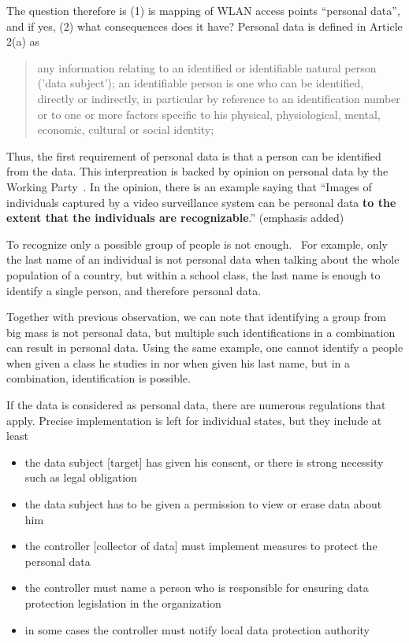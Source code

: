 \documentclass[12pt,a4paper,oneside,pdftex]{report}
\begin{document}
The question therefore is (1) is mapping of WLAN access points ``personal data'', and if yes, (2) what consequences does it have? Personal data is defined in Article 2(a) as

\begin{quote}
    any information relating to an identified or identifiable natural person ('data subject'); an identifiable person is one who can be identified, directly or indirectly, in particular by reference to an identification number or to one or more factors specific to his physical, physiological, mental, economic, cultural or social identity;
\end{quote}

Thus, the first requirement of personal data is that a person can be identified from the data. This interpreation is backed by opinion on personal data by the Working Party~\cite{wp29_136}. In the opinion, there is an example saying that ``Images of individuals captured by a video surveillance system can be personal data \textbf{to the extent that the individuals are recognizable}.'' (emphasis added)

To recognize only a possible group of people is not enough.~\cite{wp29_136} For example, only the last name of an individual is not personal data when talking about the whole population of a country, but within a school class, the last name is enough to identify a single person, and therefore personal data.

Together with previous observation, we can note that identifying a group from big mass is not personal data, but multiple such identifications in a combination can result in personal data. Using the same example, one cannot identify a people when given a class he studies in nor when given his last name, but in a combination, identification is possible.

If the data is considered as personal data, there are numerous regulations that apply. Precise implementation is left for individual states, but they include at least
\begin{itemize}
    \item the data subject [target] has given his consent, or there is strong necessity such as legal obligation
    \item the data subject has to be given a permission to view or erase data about him
    \item the controller [collector of data] must implement measures to protect the personal data
    \item the controller must name a person who is responsible for ensuring data protection legislation in the organization
    \item in some cases the controller must notify local data protection authority
\end{itemize}
\end{document}
